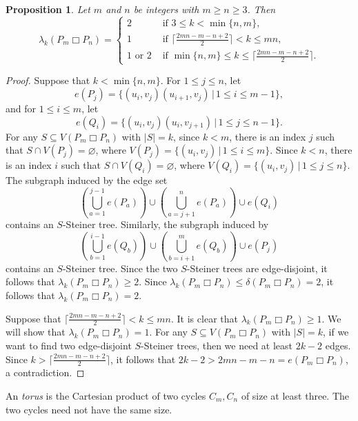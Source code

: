 \documentclass[final]{dmtcs-episciences}
\newtheorem{proposition}{Proposition}[section]
\begin{document}
\begin{proposition}
Let $m$ and $n$ be integers with $m\geq n\geq 3$. Then
\[
\lambda_k(P_m\Box P_n)= \begin{cases}
2 & \text{ if $3\leq k<\min\{n,m\}$,}\\
1 & \text{ if $\lceil \frac{2mn-m-n+2}{2}\rceil <k\leq mn$,}\\
1\text{ or }2 & \text{ if $\min\{n,m\}\leq k\leq \lceil
\frac{2mn-m-n+2}{2}\rceil$.}
\end{cases}
\]
\end{proposition}
\begin{proof}
Suppose that $k<\min\{n,m\}$. For $1\leq j\leq n$, let
\[
e(P_j)=\{(u_i,v_j)(u_{i+1},v_j)\,|\,1\leq i\leq m-1\},
\]
and for $1\leq i\leq m$, let
\[
e(Q_i)=\{(u_i,v_j)(u_{i},v_{j+1})\,|\,1\leq j\leq n-1\}.
\]
For any $S\subseteq V(P_m\Box P_n)$ with $|S|=k$, since $k<m$, there is an index $j$ such that
$S\cap V(P_j)=\varnothing$, where $V(P_j)=\{(u_i,v_j)\,|\,1\leq i\leq m\}$.
Since $k<n$, there is an index $i$ such that
$S\cap V(Q_i)=\varnothing$, where $V(Q_i)=\{(u_i,v_j)\,|\,1\leq
j\leq n\}$. The subgraph induced by the edge set
\[
\left(\bigcup_{a=1}^{j-1}e(P_a)\right)\cup
\left(\bigcup_{a=j+1}^{n}e(P_a)\right)\cup e(Q_i)
\]
contains an $S$-Steiner tree. Similarly, the subgraph induced by
\[
\left(\bigcup_{b=1}^{i-1}e(Q_b)\right)\cup
\left(\bigcup_{b=i+1}^{m}e(Q_b)\right)\cup e(P_j)
\]
contains an $S$-Steiner tree. Since the two $S$-Steiner trees are
edge-disjoint, it follows that
$\lambda_k(P_m\Box P_n)\geq 2$. Since $\lambda_k(P_m\Box P_n)\leq
\delta(P_m\Box P_n)=2$, it follows that $\lambda_k(P_m\Box P_n)= 2$.

Suppose that $\lceil \frac{2mn-m-n+2}{2}\rceil <k\leq mn$. It is
clear that $\lambda_k(P_m\Box P_n)\geq 1$. We will show that
$\lambda_k(P_m\Box P_n)=1$. For any $S\subseteq V(P_m\Box P_n)$ with
$|S|=k$, if we want to find two edge-disjoint $S$-Steiner trees,
then we need at least $2k-2$ edges. Since $k>\lceil
\frac{2mn-m-n+2}{2}\rceil$, it follows that $2k-2>2mn-m-n=e(P_m\Box
P_n)$, a contradiction.
\end{proof}

An \emph{torus} is the Cartesian product of two cycles $C_{m},C_{n}$
of size at least three. The two cycles need not have the same size.
\end{document}
